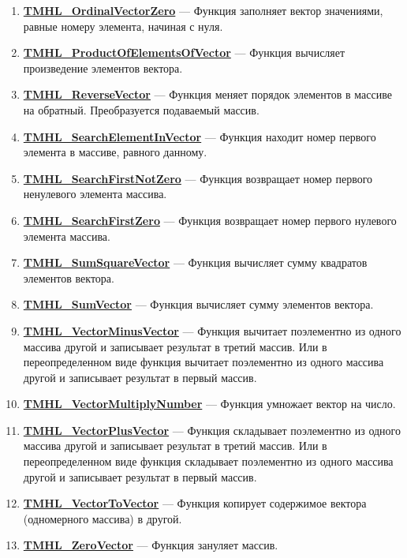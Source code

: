 \documentclass[a4paper,12pt]{article}
\begin{document}
\begin{enumerate}
\item \textbf{\hyperref[TMHL_OrdinalVectorZero]{TMHL\_OrdinalVectorZero}} --- Функция заполняет вектор значениями, равные номеру элемента, начиная с нуля.

\item \textbf{\hyperref[TMHL_ProductOfElementsOfVector]{TMHL\_ProductOfElementsOfVector}} --- Функция вычисляет произведение элементов вектора.

\item \textbf{\hyperref[TMHL_ReverseVector]{TMHL\_ReverseVector}} --- Функция меняет порядок элементов в массиве на обратный. Преобразуется подаваемый массив.

\item \textbf{\hyperref[TMHL_SearchElementInVector]{TMHL\_SearchElementInVector}} --- Функция находит номер первого элемента в массиве, равного данному.

\item \textbf{\hyperref[TMHL_SearchFirstNotZero]{TMHL\_SearchFirstNotZero}} --- Функция возвращает номер первого ненулевого элемента массива.

\item \textbf{\hyperref[TMHL_SearchFirstZero]{TMHL\_SearchFirstZero}} --- Функция возвращает номер первого нулевого элемента массива.

\item \textbf{\hyperref[TMHL_SumSquareVector]{TMHL\_SumSquareVector}} --- Функция вычисляет сумму квадратов элементов вектора.

\item \textbf{\hyperref[TMHL_SumVector]{TMHL\_SumVector}} --- Функция вычисляет сумму элементов вектора.

\item \textbf{\hyperref[TMHL_VectorMinusVector]{TMHL\_VectorMinusVector}} --- Функция вычитает поэлементно из одного массива другой и записывает результат в третий массив. Или в переопределенном виде функция вычитает поэлементно из одного массива другой и записывает результат в первый массив.

\item \textbf{\hyperref[TMHL_VectorMultiplyNumber]{TMHL\_VectorMultiplyNumber}} --- Функция умножает вектор на число.

\item \textbf{\hyperref[TMHL_VectorPlusVector]{TMHL\_VectorPlusVector}} --- Функция складывает поэлементно из одного массива другой и записывает результат в третий массив. Или в переопределенном виде функция складывает поэлементно из одного массива другой и записывает результат в первый массив.

\item \textbf{\hyperref[TMHL_VectorToVector]{TMHL\_VectorToVector}} --- Функция копирует содержимое вектора (одномерного массива) в другой.

\item \textbf{\hyperref[TMHL_ZeroVector]{TMHL\_ZeroVector}} --- Функция зануляет массив.

\end{enumerate}
\end{document}
